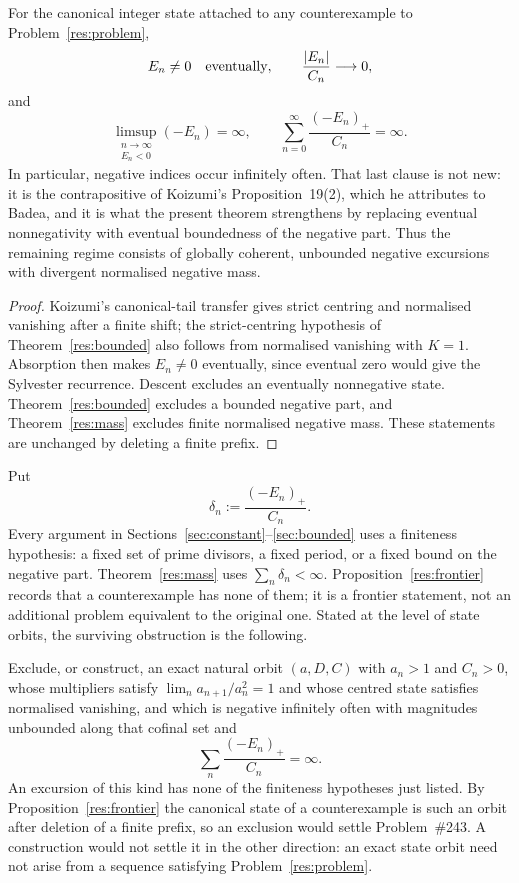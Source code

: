 \documentclass[11pt]{article}
\begin{document}
\begin{proposition}\label{res:frontier}
For the canonical integer state attached to any counterexample to
Problem~\ref{res:problem},
\[
 E_n\ne0\quad\hbox{eventually},\qquad
 \frac{|E_n|}{C_n}\longrightarrow0,
\]
and
\[
 \limsup_{\substack{n\to\infty\\E_n<0}}(-E_n)=\infty,
 \qquad
 \sum_{n=0}^{\infty}\frac{(-E_n)_+}{C_n}=\infty .
\]
In particular, negative indices occur infinitely often.  That last clause is
not new: it is the contrapositive of Koizumi's Proposition~19(2), which he
attributes to Badea, and it is what the present theorem strengthens by
replacing eventual nonnegativity with eventual boundedness of the negative
part.  Thus the remaining
regime consists of globally coherent, unbounded negative excursions with
divergent normalised negative mass.
\end{proposition}

\begin{proof}
Koizumi's canonical-tail transfer gives strict centring and normalised
vanishing after a finite shift; the strict-centring hypothesis of
Theorem~\ref{res:bounded} also follows from normalised vanishing with $K=1$.
Absorption then makes $E_n\ne0$ eventually,
since eventual zero would give the Sylvester recurrence.  Descent excludes an
eventually nonnegative state.  Theorem~\ref{res:bounded} excludes a bounded
negative part, and Theorem~\ref{res:mass} excludes finite normalised negative
mass.  These statements are unchanged by deleting a finite prefix.
\end{proof}

Put
\[
 \delta_n:=\frac{(-E_n)_+}{C_n}.
\]
Every argument in Sections~\ref{sec:constant}--\ref{sec:bounded} uses a
finiteness hypothesis: a fixed set of prime divisors, a fixed period, or a
fixed bound on the negative part.  Theorem~\ref{res:mass} uses
$\sum_n\delta_n<\infty$.  Proposition~\ref{res:frontier} records that a
counterexample has none of them; it is a frontier statement, not an additional
problem equivalent to the original one.  Stated at the level of state orbits,
the surviving obstruction is the following.

\begin{problem}\label{res:excursions}
Exclude, or construct, an exact natural orbit $(a,D,C)$ with $a_n>1$ and
$C_n>0$, whose multipliers satisfy $\lim_n a_{n+1}/a_n^{2}=1$ and whose centred
state satisfies normalised vanishing, and which is
negative infinitely often with magnitudes unbounded along that cofinal set and
\[
 \sum_n\frac{(-E_n)_+}{C_n}=\infty .
\]
An excursion of this kind has none of the finiteness hypotheses just listed.
By Proposition~\ref{res:frontier} the canonical state of a counterexample is
such an orbit after deletion of a finite prefix, so an exclusion would settle
Problem~\#243.  A construction would not settle it in the other direction: an
exact state orbit need not arise from a sequence satisfying
Problem~\ref{res:problem}.
\end{problem}
\end{document}
